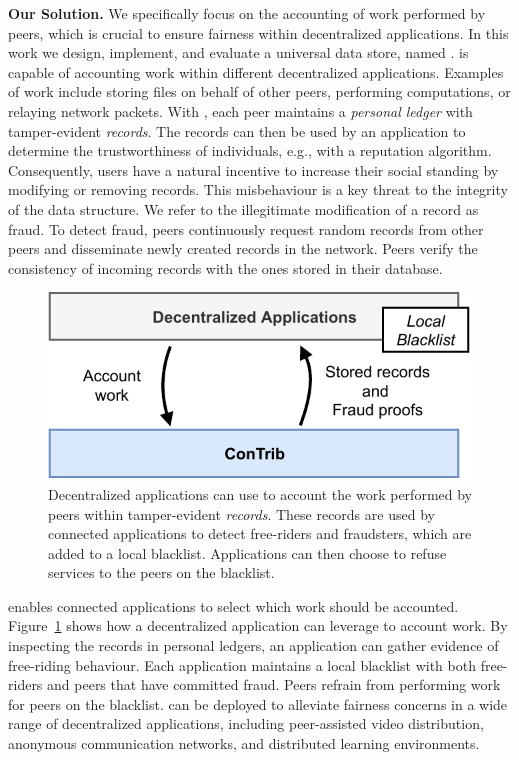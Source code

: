
\textbf{Our Solution.}
We specifically focus on the accounting of work performed by peers, which is crucial to ensure fairness within decentralized applications.
In this work we design, implement, and evaluate a universal data store, named \TrustChain{}.
\TrustChain{} is capable of accounting work within different decentralized applications.
Examples of work include storing files on behalf of other peers, performing computations, or relaying network packets.
With \TrustChain{}, each peer maintains a \emph{personal ledger} with tamper-evident \emph{records}.
The \TrustChain{} records can then be used by an application to determine the trustworthiness of individuals, e.g., with a reputation algorithm.
Consequently, users have a natural incentive to increase their social standing by modifying or removing records.
This misbehaviour is a key threat to the integrity of the \TrustChain{} data structure.
We refer to the illegitimate modification of a record as fraud.
To detect fraud, peers continuously request random records from other peers and disseminate newly created records in the network.
Peers verify the consistency of incoming records with the ones stored in their database.

\begin{figure}[t]
	\centering
	\includegraphics[width=.6\linewidth]{trustchain/assets/contrib_app_interaction}
	\caption{Decentralized applications can use \TrustChain{} to account the work performed by peers within tamper-evident \emph{records}. These records are used by connected applications to detect free-riders and fraudsters, which are added to a local blacklist. Applications can then choose to refuse services to the peers on the blacklist.}
	\label{fig:interaction_with_apps}
\end{figure}

\TrustChain{} enables connected applications to select which work should be accounted.
Figure~\ref{fig:interaction_with_apps} shows how a decentralized application can leverage \TrustChain{} to account work.
By inspecting the records in personal ledgers, an application can gather evidence of free-riding behaviour.
Each application maintains a local blacklist with both free-riders and peers that have committed fraud.
Peers refrain from performing work for peers on the blacklist.
\TrustChain{} can be deployed to alleviate fairness concerns in a wide range of decentralized applications, including peer-assisted video distribution, anonymous communication networks, and distributed learning environments.

